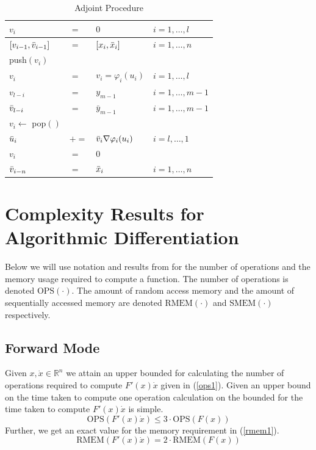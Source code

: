 \documentclass{article}
\begin{document}
\begin{table}[h]
    \centering
    \begin{tabular}{|llll|}
        \hline
        $v_{i}$ & $=$ & $0$ & $i = 1, \ldots, l$ \\
        \hline
        $[v_{i-1}, \Bar{v}_{i-1}]$ & $=$ & $[x_{i}, \Bar{x}_{i}]$ & $i = 1, \ldots, n$ \\
        \hline
        push$(v_i)$ & & & \\
        $v_{i}$ & $=$ & $v_i = \varphi_i (u_i)$ & $i = 1, \ldots, l$ \\
        \hline
        $v_{l-i}$ & $=$ & $y_{m-1}$ & $i = 1, \ldots, m-1$ \\
        $\Bar{v}_{l-i}$ & $=$ & $\bar{y}_{m-1}$ & $i = 1, \ldots, m-1$ \\
        \hline
        $v_i \leftarrow$ pop$()$ & & & \\
        $\Bar{u}_i$ & $+=$ & $\Bar{v}_i \nabla \varphi_i (u_i)$ & $i = l, \ldots, 1$ \\
        $v_i$ & $=$ & $0$ & \\
        \hline
        $\Bar{v}_{i-n}$ & $=$ & $\Bar{x}_i$ & $i = 1, \ldots, n$ \\
        \hline
    \end{tabular}
    \caption{Adjoint Procedure}
    \label{tab:ap}
\end{table}

\section{Complexity Results for Algorithmic Differentiation}

Below we will use notation and results from \cite{dhamarticle} for the number of operations and the memory usage required to compute a function. The number of operations is denoted $\text{OPS}(\cdot)$. The amount of random access memory and the amount of sequentially accessed memory are denoted $\text{RMEM}(\cdot)$ and $\text{SMEM}(\cdot)$ respectively. 

\subsection{Forward Mode}

Given $x, \Dot{x} \in \mathbb{R}^n$ we attain an upper bounded for calculating the number of operations required to compute $F'(x) \Dot{x}$ given in (\ref{ops1}). Given an upper bound on the time taken to compute one operation calculation on the bounded for the time taken to compute $F'(x) \Dot{x}$ is simple.
\begin{equation} \label{ops1}
    \text{OPS}(F'(x) \Dot{x}) \leq 3 \cdot \text{OPS}(F(x))
\end{equation}
Further, we get an exact value for the memory requirement in (\ref{rmem1}).
\begin{equation} \label{rmem1}
    \text{RMEM}(F'(x) \Dot{x}) = 2 \cdot \text{RMEM}(F(x))
\end{equation}
\end{document}
